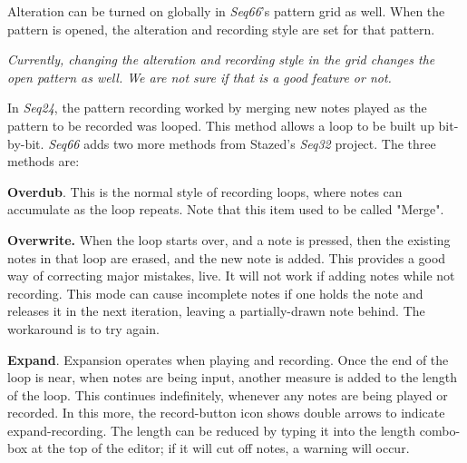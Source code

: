    Alteration can be turned on globally in \textsl{Seq66}'s pattern grid
   as well.
   When the pattern is opened, the alteration and recording style are
   set for that pattern.

   \textsl{Currently, changing the alteration and recording style in the grid
   changes the open pattern as well.  We are not sure if that is a good feature
   or not.}

   In \textsl{Seq24}, the pattern recording worked by merging new notes played
   as the pattern to be recorded was looped.  This method allows a loop to be
   built up bit-by-bit.  \textsl{Seq66} adds two more methods from
   Stazed's \textsl{Seq32} project.  The three methods are:

   \begin{enumber}
      \item \textbf{Overdub}.
         This is the normal style of recording loops, where notes can
         accumulate as the loop repeats.
         Note that this item used to be called "Merge".
      \item \textbf{Overwrite.}
         When the loop starts over, and a note is pressed,
         then the existing notes in that loop are erased,
         and the new note is added.
         This provides a good way of correcting major mistakes, live.
         It will not work if adding notes while not recording.
         This mode can cause incomplete notes if one
         holds the note and releases it in the next iteration, leaving a
         partially-drawn note behind.  The workaround is to try again.
      \item \textbf{Expand}.
         Expansion operates when playing and recording.
         Once the end of the loop is near, when
         notes are being input, another measure is added to the length
         of the loop.
         This continues indefinitely, whenever any notes are
         being played or recorded.
         In this more, the record-button icon shows double arrows to indicate
         expand-recording.
         The length can be reduced by typing it into the length combo-box
         at the top of the editor; if it will cut off notes, a warning will
         occur.

\end{enumber}
